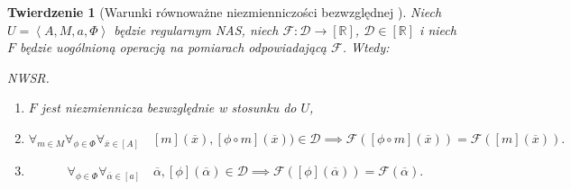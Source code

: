 \documentclass[12pt,a4paper]{report}
\newtheorem{tw}[definition]{Twierdzenie}
\newcommand{\domkniecie}[1]{\left[ {#1} \right] }
\newcommand{\tuple}[1]{\left\langle {#1} \right\rangle}
\begin{document}
\begin{tw}[Warunki równoważne niezmienniczości bezwzględnej {\citep[Tw. 1]{adams1965theory}}]
Niech $U=\tuple{A,M,a,\Phi}$ będzie regularnym NAS, niech $\mathcal{F}:\mathcal{D}\to \domkniecie{\mathbb{R}}$, $\mathcal{D} \in \domkniecie{\mathbb{R}}$ i niech $F$ będzie uogólnioną operacją na pomiarach odpowiadającą $\mathcal{F}$. Wtedy:

\item
NWSR.
\begin{enumerate}
\item
$F$ jest niezmiennicza bezwzględnie w stosunku do $U$, 
\item
$$
\forall_{m \in M}\forall_{\phi \in \Phi} \forall_{\overline{x} \in \domkniecie{A}} \quad \domkniecie{m}(\overline{x}),\domkniecie{\phi \circ m}(\overline{x})) \in \mathcal{D} \implies \mathcal{F}( \domkniecie{\phi \circ m}(\overline{x}))=\mathcal{F}(\domkniecie{m}(\overline{x})).
$$
\item
$$
\forall_{\phi \in \Phi} \forall_{\overline{\alpha} \in \domkniecie{a}} \quad \overline{\alpha}, \domkniecie{\phi}(\overline{\alpha})\in \mathcal{D} \implies \mathcal{F}(\domkniecie{\phi}(\overline{\alpha}))=\mathcal{F}(\overline{\alpha}).
$$
\end{enumerate}

\end{tw}
\end{document}
